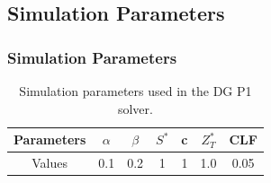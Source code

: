 \documentclass[11pt]{beamer}
\newcommand{\slideTitle}[1]{\begin{frame}\frametitle{#1}}
\begin{document}
\subsection{Simulation Parameters}

\slideTitle{Simulation Parameters}
\begin{table}[h!]
\centering
\begin{tabular}{c cccccc}
\hline
Parameters & $\alpha$ & $\beta$ & $S^\ast$ & c & $Z^\ast_T$ & CLF \\
\hline
Values & 0.1 & 0.2 & 1 & 1 & 1.0 & 0.05 \\
\hline
\end{tabular}
\caption{Simulation parameters used in the DG P1 solver.}
\label{tab:sim_parameters}
\end{table}
\end{frame}
\end{document}
